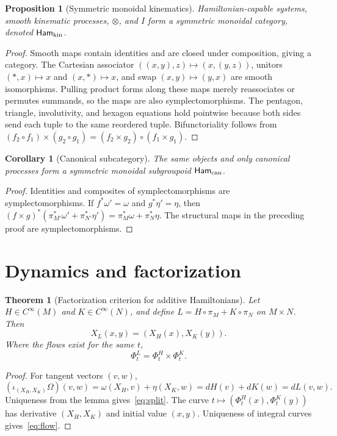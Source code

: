 \documentclass[11pt]{article}
\newtheorem{proposition}[definition]{Proposition}
\newtheorem{theorem}[definition]{Theorem}
\newtheorem{corollary}[definition]{Corollary}
\newcommand{\Ham}{\mathsf{Ham}}
\begin{document}
\begin{proposition}[Symmetric monoidal kinematics]
Hamiltonian-capable systems, smooth kinematic processes, $\otimes$, and $I$ form a symmetric monoidal category, denoted $\Ham_{\rm kin}$.
\end{proposition}
\begin{proof}
Smooth maps contain identities and are closed under composition, giving a category.  The Cartesian associator $((x,y),z)\mapsto(x,(y,z))$, unitors $(*,x)\mapsto x$ and $(x,*)\mapsto x$, and swap $(x,y)\mapsto(y,x)$ are smooth isomorphisms.  Pulling product forms along these maps merely reassociates or permutes summands, so the maps are also symplectomorphisms.  The pentagon, triangle, involutivity, and hexagon equations hold pointwise because both sides send each tuple to the same reordered tuple.  Bifunctoriality follows from
$(f_2\circ f_1)\times(g_2\circ g_1)=(f_2\times g_2)\circ(f_1\times g_1)$.
\end{proof}

\begin{corollary}[Canonical subcategory]
The same objects and only canonical processes form a symmetric monoidal subgroupoid $\Ham_{\rm can}$.
\end{corollary}
\begin{proof}
Identities and composites of symplectomorphisms are symplectomorphisms.  If $f^*\omega'=\omega$ and $g^*\eta'=\eta$, then
$(f\times g)^*(\pi_{M'}^*\omega'+\pi_{N'}^*\eta')=\pi_M^*\omega+\pi_N^*\eta$.
The structural maps in the preceding proof are symplectomorphisms.
\end{proof}

\section{Dynamics and factorization}

\begin{theorem}[Factorization criterion for additive Hamiltonians]\label{thm:factor}
Let $H\in C^\infty(M)$ and $K\in C^\infty(N)$, and define
$L=H\circ\pi_M+K\circ\pi_N$ on $M\times N$.  Then
\begin{equation}\label{eq:split}
 X_L(x,y)=(X_H(x),X_K(y)).
\end{equation}
Where the flows exist for the same $t$,
\begin{equation}\label{eq:flow}
 \Phi_t^L=\Phi_t^H\times\Phi_t^K.
\end{equation}
\end{theorem}
\begin{proof}
For tangent vectors $(v,w)$,
\[
(\iota_{(X_H,X_K)}\Omega)(v,w)
=\omega(X_H,v)+\eta(X_K,w)
=dH(v)+dK(w)=dL(v,w).
\]
Uniqueness from the lemma gives~\eqref{eq:split}.  The curve
$t\mapsto(\Phi_t^H(x),\Phi_t^K(y))$ has derivative $(X_H,X_K)$ and initial value $(x,y)$.  Uniqueness of integral curves gives~\eqref{eq:flow}.
\end{proof}
\end{document}
